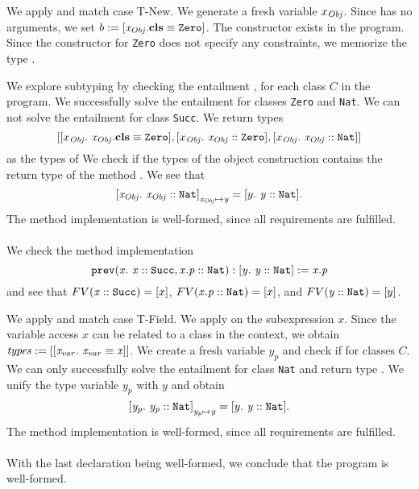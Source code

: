 \begin{example}
We apply 
and match case T-New.
We generate a fresh variable $x_{\mathit{Obj}}$.
Since  has no arguments,
we set $b := [\mathit{x_{\mathit{Obj}}}.\textbf{cls} \equiv \mathit{\texttt{Zero}}]$.
The constructor  exists in the program.
Since the constructor for \texttt{Zero} does not specify any constraints,
we memorize the type
.

We explore subtyping by checking the entailment
\entails
  {
    ,
  }
  {}
for each class $C$ in the program.
We successfully solve the entailment for
classes \texttt{Zero} and \texttt{Nat}.
We can not solve the entailment for class \texttt{Succ}.
We return types
\[ [ \type{x_{\mIt{Obj}}}{\instBy{x_{\mIt{Obj}}}{\texttt{Zero}}},\\
     \type{x_{\mIt{Obj}}}{\instOf{x_{\mIt{Obj}}}{\texttt{Zero}}},\\
     \type{x_{\mIt{Obj}}}{\instOf{x_{\mIt{Obj}}}{\texttt{Nat}}} ] \]
as the types of 
We check if the types of the object construction contains
the return type of the method .
We see that
\[\mathit{ [x_{\mathit{Obj}}.\ \mathit{\mathit{x_{\mathit{Obj}}} :: \mathit{\texttt{Nat}}}] }_{\mathit{x_{\mathit{Obj}}} \mapsto \mathit{y}}
 = [y.\ \mathit{\mathit{y} :: \mathit{\texttt{Nat}}}]. \]
The method implementation is well-formed,
since all requirements are fulfilled.\\
\\
We check the method implementation
\[
  \mathit{\texttt{prev}}(\mathit{x}.\ \mathit{\mathit{x} :: \mathit{\texttt{Succ}}, \mathit{x.p} :: \mathit{\texttt{Nat}}}): \mathit{[y.\ \mathit{\mathit{y} :: \mathit{\texttt{Nat}}}]} := \mathit{x.p}
\]
and see that
$FV(\mathit{x} :: \mathit{\texttt{Succ}}) = [x]$,
$FV(\mathit{x.p} :: \mathit{\texttt{Nat}}) = [x]$,
and
$FV(\mathit{y} :: \mathit{\texttt{Nat}}) = [y]$.

We apply 
and match case T-Field.
We apply  on the subexpression $x$.
Since the variable access $x$ can be related to a class in the context,
we obtain $\mathit{types := [[x_{\mathit{var}}.\ \mathit{\mathit{x_{\mathit{var}}} \equiv \mathit{x}}]]}$.
We create a fresh variable $y_p$
and check if
        {}
for classes $C$.
We can only successfully solve the entailment for class \texttt{Nat}
and return type .
We unify the type variable $y_p$ with $y$ and obtain
\[ \mathit{[y_p.\ \mathit{\mathit{y_p} :: \mathit{\texttt{Nat}}}]}_{\mathit{y_p} \mapsto \mathit{y}}
    = [y.\ \mathit{\mathit{y} :: \mathit{\texttt{Nat}}}]. \]
The method implementation is well-formed,
since all requirements are fulfilled.\\
\\
With the last declaration being well-formed,
we conclude that the program is well-formed.
\end{example}

